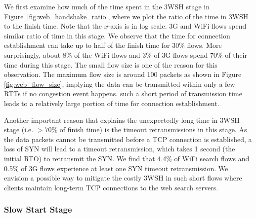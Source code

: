 We first examine how much of the time spent in the 3WSH stage in Figure~\ref{fig:web_handshake_ratio}, where we plot the ratio of the time in 3WSH to the finish time. Note that the $x$-axis is in log scale. 3G and WiFi flows spend similar ratio of time in this stage. We observe that the time for connection establishment can take up to half of the finish time for 30\% flows. More surprisingly, about 8\% of the WiFi flows and 3\% of 3G flows spend 70\% of their time during this stage. The small flow size is one of the reason for this observation. The maximum flow size is around 100 packets as shown in Figure \ref{fig:web_flow_size}, implying the data can be transmitted within only a few RTTs if no congestion event happens. such a short period of transmission time leads to a relatively large portion of time for connection establishment.




Another important reason that explains the unexpectedly long time in 3WSH stage (i.e. $>70\%$ of finish time) is the timeout retransmissions in this stage. As the data packets cannot be transmitted before a TCP connection is established, a loss of SYN will lead to a timeout retransmission, which takes 1 second (\ie the initial RTO) to retransmit the SYN.  We find that 4.4\% of WiFi search flows and 0.5\% of 3G flows experience at least one SYN timeout retransmission. We envision a possible way to mitigate the costly 3WSH in such short flows where clients maintain long-term TCP connections to the web search servers.

\subsubsection{Slow Start Stage}

